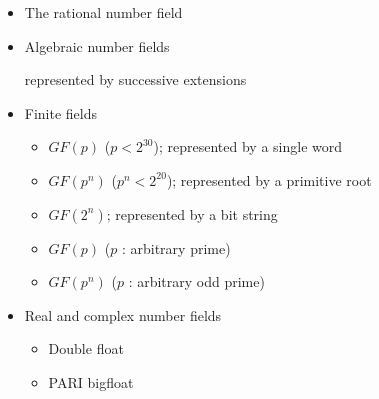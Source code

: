 \begin{slide}{}

\begin{itemize}
\item The rational number field
\item Algebraic number fields

represented by successive extensions
\item Finite fields
\begin{itemize}
\item $GF(p)$ ($p<2^{30}$); represented by a single word
\item $GF(p^n)$ ($p^n < 2^{20}$); represented by a primitive root
\item $GF(2^n)$; represented by a bit string
\item $GF(p)$ ($p$ : arbitrary prime)
\item $GF(p^n)$ ($p$ : arbitrary odd prime)
\end{itemize}

\item Real and complex number fields

\begin{itemize}
\item Double float
\item PARI bigfloat
\end{itemize}

\end{itemize}
\end{slide}

